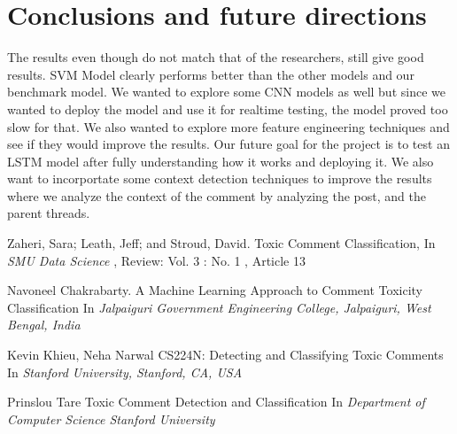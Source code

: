 \documentclass[11pt]{article}
\begin{document}
\section{Conclusions and future directions}
The results even though do not match that of the researchers, still give good results. SVM Model clearly performs better than the other models and our benchmark model. We wanted to explore some CNN models as well but since we wanted to deploy the model and use it for realtime testing, the model proved too slow for that. We also wanted to explore more feature engineering techniques and see if they would improve the results. Our future goal for the project is to test an LSTM model after fully understanding how it works and deploying it. We also want to incorportate some context detection techniques to improve the results where we analyze the context of the comment by analyzing the post, and the parent threads.  	




\begin{thebibliography}{1}

	Zaheri, Sara; Leath, Jeff; and Stroud, David.
	\newblock Toxic Comment Classification,
	\newblock In {\em SMU Data Science 
	}, Review: Vol. 3 : No. 1 , Article 13

	Navoneel Chakrabarty.
	\newblock A Machine Learning Approach to Comment
	Toxicity Classification 
	\newblock In {\em Jalpaiguri Government Engineering College, Jalpaiguri, West Bengal, India}

	Kevin Khieu, Neha Narwal
	\newblock CS224N: Detecting and Classifying Toxic Comments
	\newblock In {\em Stanford University, Stanford, CA, USA}

	Prinslou Tare
	\newblock Toxic Comment Detection and Classiﬁcation
	\newblock In {\em Department of Computer Science
	Stanford University}
\end{thebibliography}
\end{document}
